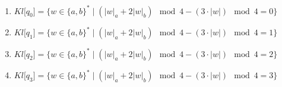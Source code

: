 \documentclass[a4paper]{article}
\begin{document}
\begin{enumerate}
\item
$Kl\big[q_0\big] = \Big\{w \in \big\{a,b\big\}^* \mid 
(\lvert w \rvert_a + 2\lvert w \rvert_b)\mod{4} - (3 \cdot \lvert w \rvert)\mod{4} = 0\Big\}$
\item
$Kl\big[q_1\big] = \Big\{w \in \big\{a,b\big\}^* \mid 
(\lvert w \rvert_a + 2\lvert w \rvert_b)\mod{4} - (3 \cdot \lvert w \rvert)\mod{4} = 1    \Big\}$
\item
$Kl\big[q_2\big] = \Big\{w \in \big\{a,b\big\}^* \mid 
(\lvert w \rvert_a + 2\lvert w \rvert_b)\mod{4} - (3 \cdot \lvert w \rvert)\mod{4} = 2    \Big\}$
\item
$Kl\big[q_3\big] = \Big\{w \in \big\{a,b\big\}^* \mid 
(\lvert w \rvert_a + 2\lvert w \rvert_b)\mod{4} - (3 \cdot \lvert w \rvert)\mod{4} = 3    \Big\}$
\end{enumerate}
\end{document}
